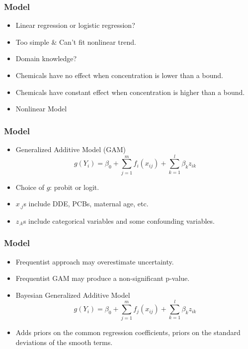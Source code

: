 \documentclass{beamer}
\begin{document}
\begin{frame}
\frametitle{Model}


\begin{itemize}
\item Linear regression or logistic regression?
\pause
\item Too simple $\&$ Can't fit nonlinear trend.
\pause
\item Domain knowledge?
\pause
\item Chemicals have no effect when concentration is lower than a bound.
\pause
\item Chemicals have constant effect when concentration is higher than a bound.
\pause
\item Nonlinear Model
\end{itemize}
\end{frame}











\begin{frame}
\frametitle{Model}


\begin{itemize}
\item Generalized Additive Model (GAM)
$$g(Y_i) = \beta_0 + \sum_{j=1}^m f_i(x_{ij}) + \sum_{k=1}^l \beta_{k}z_{ik}$$

\item Choice of $g$: probit or logit.
\item $x_{.j}$s include DDE, PCBs, maternal age, etc.
\item $z_{.k}$s include categorical variables and some confounding variables.

\end{itemize}
\end{frame}




\begin{frame}
\frametitle{Model}

\begin{itemize}

\item Frequentist approach may overestimate uncertainty.
\item Frequentist GAM may produce a non-significant p-value.
\pause
\item Bayesian Generalized Additive Model
$$g(Y_i) = \beta_0 + \sum_{j=1}^m f_j(x_{ij}) + \sum_{k=1}^l \beta_{k}z_{ik}$$

\item Adds priors on the common regression coefficients, priors on the standard deviations of the smooth terms.


\end{itemize}
\end{frame}
\end{document}
